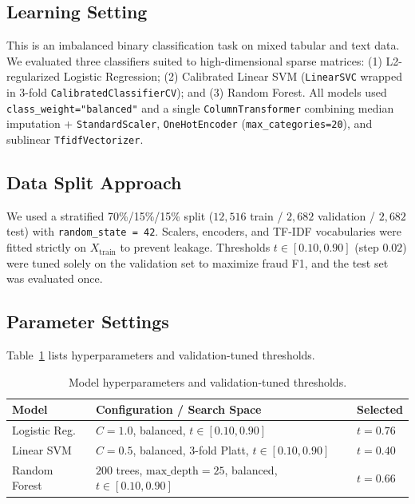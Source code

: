 \documentclass[conference,a4paper]{IEEEtran}
\begin{document}
\subsection{Learning Setting}
This is an imbalanced binary classification task on mixed tabular and text data. We evaluated three classifiers suited to high-dimensional sparse matrices: (1) L2-regularized Logistic Regression; (2) Calibrated Linear SVM (\texttt{LinearSVC} wrapped in 3-fold \texttt{CalibratedClassifierCV}); and (3) Random Forest. All models used \texttt{class\_weight="balanced"} and a single \texttt{ColumnTransformer} combining median imputation + \texttt{StandardScaler}, \texttt{OneHotEncoder} (\texttt{max\_categories=20}), and sublinear \texttt{TfidfVectorizer}.

\subsection{Data Split Approach}
We used a stratified 70\%/15\%/15\% split ($12,516$ train / $2,682$ validation / $2,682$ test) with \texttt{random\_state = 42}. Scalers, encoders, and TF-IDF vocabularies were fitted strictly on $X_{\text{train}}$ to prevent leakage. Thresholds $t \in [0.10, 0.90]$ (step $0.02$) were tuned solely on the validation set to maximize fraud F1, and the test set was evaluated once.

\subsection{Parameter Settings}
Table~\ref{tab:b1_params} lists hyperparameters and validation-tuned thresholds.

\begin{table}[htbp]
\centering
\caption{Model hyperparameters and validation-tuned thresholds.}
\label{tab:b1_params}
\scriptsize
\renewcommand{\arraystretch}{0.92}
\begin{tabularx}{\columnwidth}{lXl}
\toprule
\textbf{Model} & \textbf{Configuration / Search Space} & \textbf{Selected} \\
\midrule
Logistic Reg. & $C=1.0$, balanced, $t \in [0.10, 0.90]$ & $t = 0.76$ \\
Linear SVM & $C=0.5$, balanced, 3-fold Platt, $t \in [0.10, 0.90]$ & $t = 0.40$ \\
Random Forest & $200$ trees, $\text{max\_depth}=25$, balanced, $t \in [0.10, 0.90]$ & $t = 0.66$ \\
\bottomrule
\end{tabularx}
\end{table}
\end{document}
